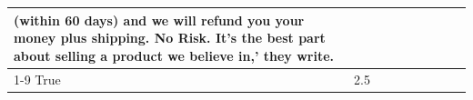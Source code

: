 \begin{table}[H]
{\begin{tabular}{lllrlllll}
(within 60 days) and we will refund you your money plus shipping. No Risk. It’s the best part about selling a product we believe in,' they write.

 \\
\cline{1-9}
True & 2.5%
\end{tabular}}
\end{table}
